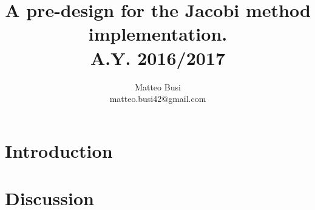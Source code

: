 \documentclass[11pt]{article}
\author{Matteo Busi\\
	matteo.busi42@gmail.com}
\title{%
	\huge{ A pre-design for the Jacobi method implementation. }\\
	A.Y. 2016/2017
}
\begin{document}
	\maketitle
	
	\section{Introduction}\label{sec:intro}%
	
	
	\section{Discussion}\label{sec:seq}%
	
\end{document}
